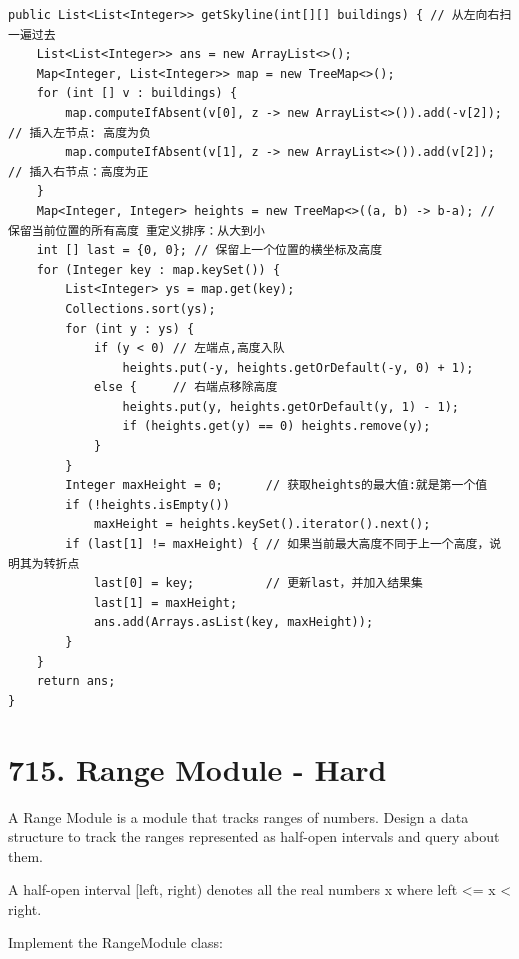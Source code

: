 \documentclass[9pt, b5paaper]{book}
\begin{document}
\begin{verbatim}
public List<List<Integer>> getSkyline(int[][] buildings) { // 从左向右扫一遍过去
    List<List<Integer>> ans = new ArrayList<>();
    Map<Integer, List<Integer>> map = new TreeMap<>();
    for (int [] v : buildings) {
        map.computeIfAbsent(v[0], z -> new ArrayList<>()).add(-v[2]); // 插入左节点: 高度为负
        map.computeIfAbsent(v[1], z -> new ArrayList<>()).add(v[2]);  // 插入右节点：高度为正
    }
    Map<Integer, Integer> heights = new TreeMap<>((a, b) -> b-a); // 保留当前位置的所有高度 重定义排序：从大到小
    int [] last = {0, 0}; // 保留上一个位置的横坐标及高度           
    for (Integer key : map.keySet()) {
        List<Integer> ys = map.get(key);
        Collections.sort(ys);
        for (int y : ys) {
            if (y < 0) // 左端点,高度入队
                heights.put(-y, heights.getOrDefault(-y, 0) + 1);
            else {     // 右端点移除高度
                heights.put(y, heights.getOrDefault(y, 1) - 1);
                if (heights.get(y) == 0) heights.remove(y);
            }
        }
        Integer maxHeight = 0;      // 获取heights的最大值:就是第一个值
        if (!heights.isEmpty())
            maxHeight = heights.keySet().iterator().next();
        if (last[1] != maxHeight) { // 如果当前最大高度不同于上一个高度，说明其为转折点
            last[0] = key;          // 更新last，并加入结果集
            last[1] = maxHeight;
            ans.add(Arrays.asList(key, maxHeight));
        }
    }
    return ans;
}
\end{verbatim}

\section{715. Range Module - Hard}
\label{sec-19-2}
A Range Module is a module that tracks ranges of numbers. Design a data structure to track the ranges represented as half-open intervals and query about them.

A half-open interval [left, right) denotes all the real numbers x where left <= x < right.

Implement the RangeModule class:
\end{document}
